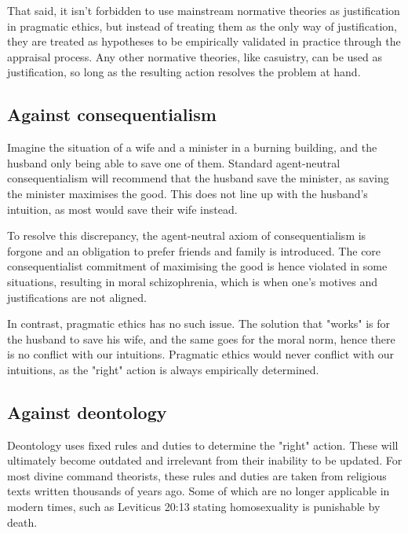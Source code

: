 \documentclass[11pt]{article}
\begin{document}
That said, it isn't forbidden to use mainstream normative theories
as justification in pragmatic ethics, but instead of treating them
as the only way of justification, they are treated as hypotheses
to be empirically validated in practice through the appraisal process.
Any other normative theories, like casuistry,
can be used as justification,
so long as the resulting action resolves the problem at hand.
\subsection{Against consequentialism}
\label{sec:org2ee454a}
Imagine the situation of a wife and a minister in a burning building,
and the husband only being able to save one of them.
Standard agent-neutral consequentialism
will recommend that the husband save the minister,
as saving the minister maximises the good.
This does not line up with the husband's intuition,
as most would save their wife instead.

To resolve this discrepancy, the agent-neutral axiom of consequentialism
is forgone and an obligation to prefer friends and family is introduced.
The core consequentialist commitment
of maximising the good is hence violated in some situations,
resulting in moral schizophrenia,
which is when one's motives and justifications are not aligned.

In contrast, pragmatic ethics has no such issue.
The solution that "works" is for the husband to save his wife,
and the same goes for the moral norm,
hence there is no conflict with our intuitions.
Pragmatic ethics would never conflict with our intuitions,
as the "right" action is always empirically determined.

\clearpage
\subsection{Against deontology}
\label{sec:orgdcaf1d3}
Deontology uses fixed rules and duties to determine the "right" action.
These will ultimately become outdated and irrelevant
from their inability to be updated.
For most divine command theorists,
these rules and duties are taken from religious texts
written thousands of years ago.
Some of which are no longer applicable in modern times,
such as Leviticus 20:13 stating homosexuality is punishable by death.
\end{document}
